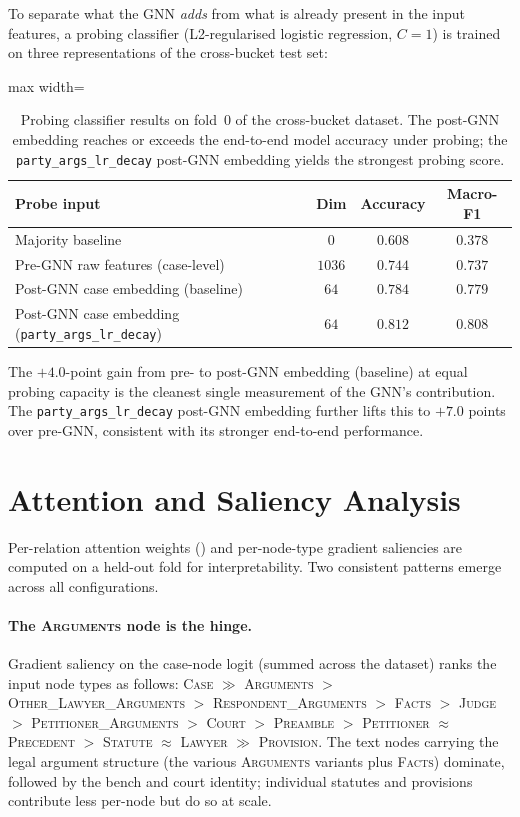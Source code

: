To separate what the GNN \emph{adds} from what is already present in
the input features, a probing classifier (L2-regularised logistic
regression, $C\!=\!1$) is trained on three representations of the
cross-bucket test set:

\begin{table}[H]
  \centering
  \small
  \begin{adjustbox}{max width=\textwidth}
  \begin{tabular}{lccc}
    \toprule
    Probe input & Dim & Accuracy & Macro-F1 \\
    \midrule
    Majority baseline & $0$ & $0.608$ & $0.378$ \\
    Pre-GNN raw features (case-level) & $1036$ & $0.744$ & $0.737$ \\
    Post-GNN case embedding (baseline) & $64$ & $0.784$ & $0.779$ \\
    Post-GNN case embedding (\texttt{party\_args\_lr\_decay}) & $64$ & $0.812$ & $0.808$ \\
    \bottomrule
  \end{tabular}
  \end{adjustbox}
  \caption{Probing classifier results on fold~0 of the cross-bucket
  dataset. The post-GNN embedding reaches or exceeds the end-to-end
  model accuracy under probing; the \texttt{party\_args\_lr\_decay}
  post-GNN embedding yields the strongest probing score.}
  \label{tab:probing}
\end{table}

The $+4.0$-point gain from pre- to post-GNN embedding (baseline) at
equal probing capacity is the cleanest single measurement of the GNN's
contribution. The \texttt{party\_args\_lr\_decay} post-GNN embedding
further lifts this to $+7.0$ points over pre-GNN, consistent with its
stronger end-to-end performance.

\section{Attention and Saliency Analysis}

Per-relation attention weights () and
per-node-type gradient saliencies are computed on a held-out fold for
interpretability. Two consistent patterns emerge across all
configurations.

\paragraph{The \textsc{Arguments} node is the hinge.} Gradient
saliency on the case-node logit (summed across the dataset) ranks the
input node types as follows: \textsc{Case} $\gg$ \textsc{Arguments} $>$
\textsc{Other\_Lawyer\_Arguments} $>$ \textsc{Respondent\_Arguments}
$>$ \textsc{Facts} $>$ \textsc{Judge} $>$ \textsc{Petitioner\_Arguments}
$>$ \textsc{Court} $>$ \textsc{Preamble} $>$ \textsc{Petitioner}
$\approx$ \textsc{Precedent} $>$ \textsc{Statute} $\approx$
\textsc{Lawyer} $\gg$ \textsc{Provision}. The text nodes carrying the
legal argument structure (the various \textsc{Arguments} variants plus
\textsc{Facts}) dominate, followed by the bench and court identity;
individual statutes and provisions contribute less per-node but do so
at scale.


